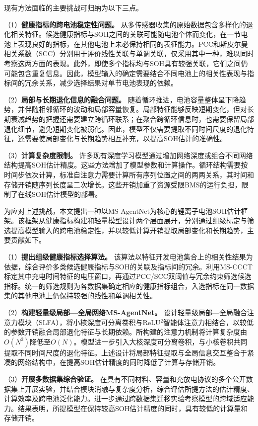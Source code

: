现有方法面临的主要挑战可归纳为以下三点。

（1）\textbf{健康指标的跨电池稳定性问题。} 从多传感器收集的原始数据包含多样化的退化相关特征。候选健康指标与SOH之间的关联可能随电池个体而变化，在一节电池上表现良好的指标，在其他电池上未必保持相同的表征能力。PCC和斯皮尔曼相关系数（SCC）分别用于评价线性关联与单调关联，仅采用其中一种，难以同时考察这两方面的表现。此外，即使多个指标均与SOH具有较强关联，它们之间仍可能包含重复信息。因此，模型输入的确定需要结合不同电池上的相关性表现与指标间的冗余关系，减少选择结果对单节电池表现的依赖。

（2）\textbf{局部与长期退化信息的融合问题。} 随着循环推进，电池容量整体呈下降趋势，并伴随相邻循环的波动和局部容量恢复。局部特征能够反映短期变化，但对长期衰减趋势的把握还需要建立跨循环联系；在聚合跨循环信息时，也需要保留局部退化细节，避免短期变化被弱化。因此，模型不仅需要提取不同时间尺度的退化特征，还需要使局部变化与长期趋势相互补充，以提高SOH估计的准确性。

（3）\textbf{计算复杂度限制。} 许多现有深度学习模型通过增加网络深度或组合不同网络结构提高SOH估计精度。这些方法增加了模型参数和计算操作。循环结构需要按时间步依次计算，标准自注意力需要计算所有序列位置之间的两两关系，其时间和存储开销随序列长度呈二次增长。这些开销加重了资源受限BMS的运行负担，限制了在线SOH估计模型的部署。

为应对上述挑战，本文提出一种以MS-AgentNet为核心的锂离子电池SOH估计框架。该框架从健康指标构建和轻量模型设计两个层面展开，分别通过组级标定与筛选提高模型输入的跨电池稳定性，并以较低计算开销提取局部变化和长期趋势，主要贡献如下。

（1）\textbf{提出组级健康指标选择算法。} 该算法以特征开发电池集合上的相关性结果为依据，综合评价多类候选健康指标与SOH的关联及指标间的冗余。利用MS-CCCT标定其中充电时间特征的电压窗口，再通过PCC/SCC双阈值与冗余约束筛选候选指标。统一的筛选规则为各数据集确定相应的健康指标组合，入选指标在同一数据集的其他电池上仍保持较强的线性和单调相关性。

（2）\textbf{构建轻量级局部—全局网络MS-AgentNet。} 设计轻量级局部—全局融合注意力模块（SLFA），将小核深度可分离卷积与ReLU$^2$智能体注意力相结合，以较低的参数开销融合局部退化特征与长期依赖。所构建的注意力机制将计算复杂度由$O(N^2)$降低至$O(N)$。模型进一步引入大核深度可分离卷积，与小核卷积共同提取不同时间尺度的退化特征。上述设计将局部特征提取与全局信息交互整合于紧凑的网络结构中，在提高SOH估计精度的同时降低了计算与存储开销。

（3）\textbf{开展多数据集综合验证。} 在具有不同材料、容量和充放电协议的多个公开数据集上开展实验，并结合模块消融与复杂度分析，综合评估所提方法的估计精度、计算效率及跨电池泛化能力。进一步通过跨数据集迁移实验考察模型的跨域适应能力。结果表明，所提模型在保持较高SOH估计精度的同时，具有较低的计算量和存储开销。
